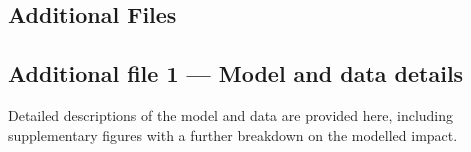 \documentclass[doublespacing]{bmcart}
\begin{document}
\begin{backmatter}
\section*{Additional Files}
%

\subsection*{Additional file 1 --- Model and data details}
    Detailed descriptions of the model and data are provided here, including supplementary figures with a further breakdown on the modelled impact. 


\end{backmatter}
\end{document}
